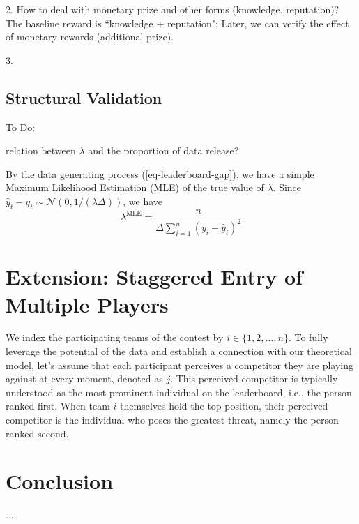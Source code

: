 \documentclass[mnsc]{informs3}
\begin{document}
2. How to deal with monetary prize and other forms (knowledge, reputation)? The baseline reward is ``knowledge + reputation"; Later, we can verify the effect of monetary rewards (additional prize). 

3. 


\subsection{Structural Validation}

To Do:

relation between $\lambda$ and the proportion of data release?

By the data generating process (\ref{eq-leaderboard-gap}), we have a simple Maximum Likelihood Estimation (MLE) of the true value of $\lambda$. 
Since $\hat{y}_t - y_t \sim \mathcal{N}(0, 1/(\lambda\Delta))$, we have 
\begin{equation*}
\lambda^{\text{MLE}} = \frac{n}{\Delta\sum^n_{i=1}(y_i - \hat{y}_i)^2}
\end{equation*}


\newpage

\section{Extension: Staggered Entry of Multiple Players}
\label{sect-extension}

We index the participating teams of the contest by $i\in\{1, 2, ..., n\}$. 
To fully leverage the potential of the data and establish a connection with our theoretical model, let's assume that each participant perceives a competitor they are playing against at every moment, denoted as $j$. 
This perceived competitor is typically understood as the most prominent individual on the leaderboard, i.e., the person ranked first.
When team $i$ themselves hold the top position, their perceived competitor is the individual who poses the greatest threat, namely the person ranked second.

\section{Conclusion}

...

%
%
%
\end{document}
